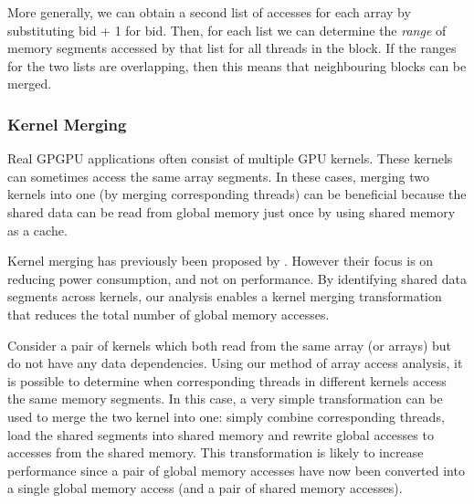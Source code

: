 \documentclass{article}
\renewcommand{\|}{\:|\:}
\begin{document}
More generally, we can obtain a second list of accesses for each array by substituting bid + 1 for bid. Then, for each list we can determine the \emph{range} of memory segments accessed by that list for all threads in the block. If the ranges for the two lists are overlapping, then this means that neighbouring blocks can be merged.


\subsubsection{Kernel Merging}
Real GPGPU applications often consist of multiple GPU kernels. These kernels can sometimes access the same array segments. In these cases, merging two kernels into one (by merging corresponding threads) can be beneficial because the shared data can be read from global memory just once by using shared memory as a cache.

Kernel merging has previously been proposed by \cite{kernel-fusion}. However their focus is on reducing power consumption, and not on performance. By identifying shared data segments across kernels, our analysis enables a kernel merging transformation that reduces the total number of global memory accesses.

Consider a pair of kernels which both read from the same array (or arrays) but do not have any data dependencies. Using our method of array access analysis, it is possible to determine when corresponding threads in different kernels access the same memory segments. In this case, a very simple transformation can be used to merge the two kernel into one: simply combine corresponding threads, load the shared segments into shared memory and rewrite global accesses to accesses from the shared memory. This transformation is likely to increase performance since a pair of global memory accesses have now been converted into a single global memory access (and a pair of shared memory accesses).
\end{document}
